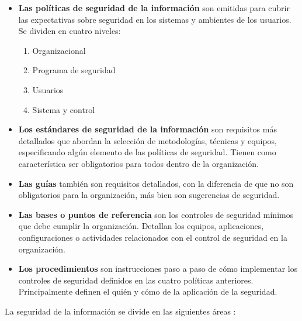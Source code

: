 \begin{itemize}[noitemsep]
\item \textbf{Las políticas de seguridad de la información} son emitidas para cubrir las expectativas sobre seguridad en los sistemas y ambientes de los usuarios. Se dividen en cuatro niveles: 

\begin{enumerate}[noitemsep]
	\item Organizacional
	\item Programa de seguridad
	\item Usuarios
	\item Sistema y control
\end{enumerate}

\item \textbf{Los estándares de seguridad de la información} son requisitos más detallados que abordan la selección de metodologías, técnicas y equipos, especificando algún elemento de las políticas de seguridad. Tienen como característica ser obligatorios para todos dentro de la organización.

\item \textbf{Las guías} también son requisitos detallados, con la diferencia de que no son obligatorios para la organización, más bien son sugerencias de seguridad.

\item \textbf{Las bases o puntos de referencia} son los controles de seguridad mínimos que debe cumplir la organización. Detallan los equipos, aplicaciones, configuraciones o actividades relacionados con el control de seguridad en la organización.

\item \textbf{Los procedimientos} son instrucciones paso a paso de cómo implementar los controles de seguridad definidos en las cuatro políticas anteriores. Principalmente definen el quién y cómo de la aplicación de la seguridad. 

\end{itemize}

La seguridad de la información se divide en las siguientes áreas \cite{jacobs2015engineering}:

